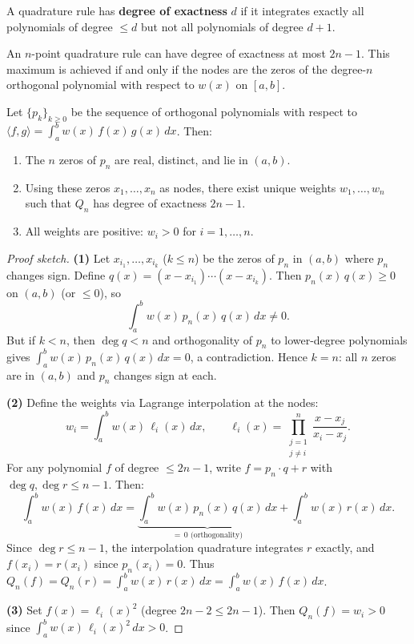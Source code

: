 \begin{definition}
\label{def:degree-exactness}
A quadrature rule has \textbf{degree of exactness} $d$ if it integrates exactly all polynomials of degree $\leq d$ but not all polynomials of degree $d+1$.
\end{definition}

\begin{theorem}
\label{thm:max-exactness}
An $n$-point quadrature rule can have degree of exactness at most $2n-1$. This maximum is achieved if and only if the nodes are the zeros of the degree-$n$ orthogonal polynomial with respect to $w(x)$ on $[a,b]$.
\end{theorem}

\begin{theorem}
\label{thm:gauss-quadrature}
Let $\{p_k\}_{k \geq 0}$ be the sequence of orthogonal polynomials with respect to $\langle f, g \rangle = \int_a^b w(x)\,f(x)\,g(x)\,dx$. Then:
\begin{enumerate}
    \item The $n$ zeros of $p_n$ are real, distinct, and lie in $(a,b)$.
    \item Using these zeros $x_1, \ldots, x_n$ as nodes, there exist unique weights $w_1, \ldots, w_n$ such that $Q_n$ has degree of exactness $2n-1$.
    \item All weights are positive: $w_i > 0$ for $i = 1, \ldots, n$.
\end{enumerate}
\end{theorem}

\begin{proof}[Proof sketch]
\textbf{(1)} Let $x_{i_1}, \ldots, x_{i_k}$ ($k \leq n$) be the zeros of $p_n$ in $(a,b)$ where $p_n$ changes sign. Define $q(x) = (x - x_{i_1})\cdots(x-x_{i_k})$. Then $p_n(x)\,q(x) \geq 0$ on $(a,b)$ (or $\leq 0$), so
\[
    \int_a^b w(x)\,p_n(x)\,q(x)\,dx \neq 0.
\]
But if $k < n$, then $\deg q < n$ and orthogonality of $p_n$ to lower-degree polynomials gives $\int_a^b w(x)\,p_n(x)\,q(x)\,dx = 0$, a contradiction. Hence $k = n$: all $n$ zeros are in $(a,b)$ and $p_n$ changes sign at each.

\textbf{(2)} Define the weights via Lagrange interpolation at the nodes:
\[
    w_i = \int_a^b w(x)\,\ell_i(x)\,dx, \qquad \ell_i(x) = \prod_{\substack{j=1 \\ j\neq i}}^{n} \frac{x - x_j}{x_i - x_j}.
\]
For any polynomial $f$ of degree $\leq 2n-1$, write $f = p_n \cdot q + r$ with $\deg q, \deg r \leq n-1$. Then:
\[
    \int_a^b w(x)\,f(x)\,dx = \underbrace{\int_a^b w(x)\,p_n(x)\,q(x)\,dx}_{=\,0 \text{ (orthogonality)}} + \int_a^b w(x)\,r(x)\,dx.
\]
Since $\deg r \leq n-1$, the interpolation quadrature integrates $r$ exactly, and $f(x_i) = r(x_i)$ since $p_n(x_i) = 0$. Thus $Q_n(f) = Q_n(r) = \int_a^b w(x)\,r(x)\,dx = \int_a^b w(x)\,f(x)\,dx$.

\textbf{(3)} Set $f(x) = \ell_i(x)^2$ (degree $2n-2 \leq 2n-1$). Then $Q_n(f) = w_i > 0$ since $\int_a^b w(x)\,\ell_i(x)^2\,dx > 0$.
\end{proof}

